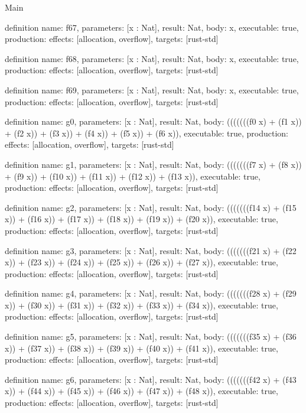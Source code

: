 \begin{lexlean}{Main}
\begin{semanticmodule}
definition{
  name: f67,
  parameters: [x : Nat],
  result: Nat,
  body: x,
  executable: true,
  production: {effects: [allocation, overflow], targets: [rust-std]}
}

definition{
  name: f68,
  parameters: [x : Nat],
  result: Nat,
  body: x,
  executable: true,
  production: {effects: [allocation, overflow], targets: [rust-std]}
}

definition{
  name: f69,
  parameters: [x : Nat],
  result: Nat,
  body: x,
  executable: true,
  production: {effects: [allocation, overflow], targets: [rust-std]}
}

definition{
  name: g0,
  parameters: [x : Nat],
  result: Nat,
  body: (((((((f0 x) + (f1 x)) + (f2 x)) + (f3 x)) + (f4 x)) + (f5 x)) + (f6 x)),
  executable: true,
  production: {effects: [allocation, overflow], targets: [rust-std]}
}

definition{
  name: g1,
  parameters: [x : Nat],
  result: Nat,
  body: (((((((f7 x) + (f8 x)) + (f9 x)) + (f10 x)) + (f11 x)) + (f12 x)) + (f13 x)),
  executable: true,
  production: {effects: [allocation, overflow], targets: [rust-std]}
}

definition{
  name: g2,
  parameters: [x : Nat],
  result: Nat,
  body: (((((((f14 x) + (f15 x)) + (f16 x)) + (f17 x)) + (f18 x)) + (f19 x)) + (f20 x)),
  executable: true,
  production: {effects: [allocation, overflow], targets: [rust-std]}
}

definition{
  name: g3,
  parameters: [x : Nat],
  result: Nat,
  body: (((((((f21 x) + (f22 x)) + (f23 x)) + (f24 x)) + (f25 x)) + (f26 x)) + (f27 x)),
  executable: true,
  production: {effects: [allocation, overflow], targets: [rust-std]}
}

definition{
  name: g4,
  parameters: [x : Nat],
  result: Nat,
  body: (((((((f28 x) + (f29 x)) + (f30 x)) + (f31 x)) + (f32 x)) + (f33 x)) + (f34 x)),
  executable: true,
  production: {effects: [allocation, overflow], targets: [rust-std]}
}

definition{
  name: g5,
  parameters: [x : Nat],
  result: Nat,
  body: (((((((f35 x) + (f36 x)) + (f37 x)) + (f38 x)) + (f39 x)) + (f40 x)) + (f41 x)),
  executable: true,
  production: {effects: [allocation, overflow], targets: [rust-std]}
}

definition{
  name: g6,
  parameters: [x : Nat],
  result: Nat,
  body: (((((((f42 x) + (f43 x)) + (f44 x)) + (f45 x)) + (f46 x)) + (f47 x)) + (f48 x)),
  executable: true,
  production: {effects: [allocation, overflow], targets: [rust-std]}
}


\end{semanticmodule}
\end{lexlean}
